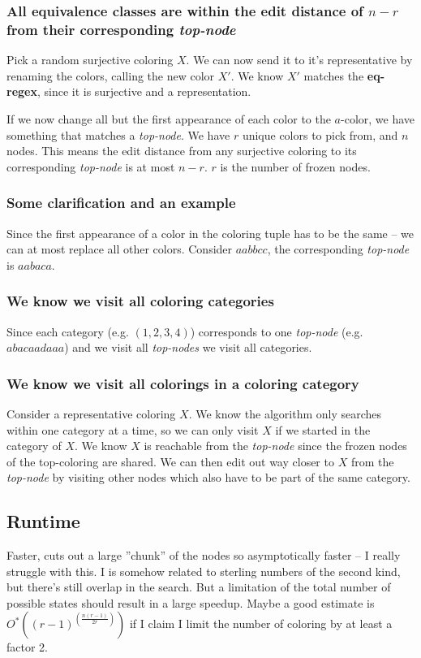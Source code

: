 \documentclass{article}
\begin{document}
\subsubsection{All equivalence classes are within the edit distance of $n - r$ from their corresponding \textit{top-node}}
Pick a random surjective coloring $X$. We can now send it to it's representative by renaming the colors, calling the new color $X'$.
We know $X'$ matches the \textbf{eq-regex}, since it is surjective and a representation.

If we now change all but the first appearance of each color to the $a$-color, we have something that matches a \textit{top-node}.
We have $r$ unique colors to pick from, and $n$ nodes.
This means the edit distance from any surjective coloring to its corresponding \textit{top-node} is at most $n - r$. $r$ is the number of frozen nodes.

\subsubsection{Some clarification and an example}
Since the first appearance of a color in the coloring tuple has to be the same -- we can at most replace all other colors.
Consider $aabbcc$, the corresponding \textit{top-node} is $aabaca$.

\subsubsection{We know we visit all coloring categories} 
Since each category (e.g. $(1, 2, 3, 4)$) corresponds to one \textit{top-node} (e.g. $abacaadaaa$) and we visit all \textit{top-nodes} we visit all categories.

\subsubsection{We know we visit all colorings in a coloring category} 
Consider a representative coloring $X$. We know the algorithm only searches within one category at a time, so we can only visit $X$ if we started in the category of $X$.
We know $X$ is reachable from the \textit{top-node} since the frozen nodes of the top-coloring are shared. We can then edit out way closer to $X$ from the \textit{top-node} by visiting other nodes which also have to be part of the same category.

\subsection{Runtime}
Faster, cuts out a large ''chunk'' of the nodes so asymptotically faster -- I really struggle with this. I is somehow related to sterling numbers of the second kind, 
but there's still overlap in the search. But a limitation of the total number of possible states should result in a large speedup.
Maybe a good estimate is $O^*(\left(r-1\right)^{\left(\frac{n\left(r-1\right)}{2r}\right)})$ if I claim I limit the number of coloring by at least a factor 2.
\end{document}
